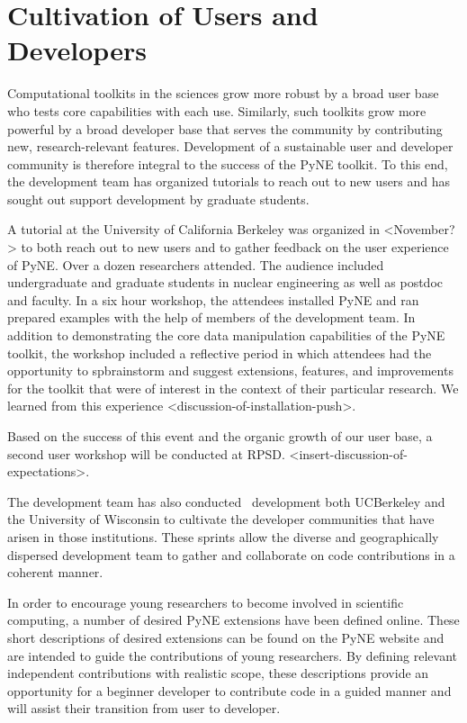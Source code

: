 \documentclass{anstrans}
\begin{document}
\section{Cultivation of Users and Developers} 
Computational toolkits in the sciences grow more robust by a broad user base who tests core capabilities with each use. Similarly, such toolkits grow more powerful by a broad developer base that serves the community by contributing new, research-relevant features. Development of a sustainable user and developer community is therefore integral to the success of the PyNE toolkit. To this end, the development team has organized tutorials to reach out to new users and has sought out support development by graduate students.

A tutorial at the University of California Berkeley was organized in <November?> to both reach out to new users and to gather feedback on the user experience of PyNE. Over a dozen researchers attended. The audience included undergraduate and graduate students in nuclear engineering as well as postdoc and faculty. In a six hour workshop, the attendees installed PyNE and ran prepared examples with the help of members of the development team. In addition to demonstrating the core data manipulation capabilities of the PyNE toolkit, the workshop included a reflective period in which attendees had the opportunity to spbrainstorm and suggest extensions, features, and improvements for the toolkit that were of interest in the context of their particular research. We learned from this experience <discussion-of-installation-push>.

Based on the success of this event and the organic growth of our user base, a second user workshop will be conducted at RPSD. <insert-discussion-of-expectations>.

The development team has also conducted  development both UCBerkeley and the University of Wisconsin to cultivate the developer communities that have arisen in those institutions. These sprints allow the diverse and geographically dispersed development team to gather and collaborate on code contributions in a coherent manner.

In order to encourage young researchers to become involved in scientific computing, a number of desired PyNE extensions have been defined online. These short descriptions of desired extensions can be found on the PyNE website and are intended to guide the contributions of young researchers. By defining relevant independent contributions with realistic scope, these descriptions provide an opportunity for a beginner developer to contribute code in a guided manner and will assist their transition from user to developer.
\end{document}
